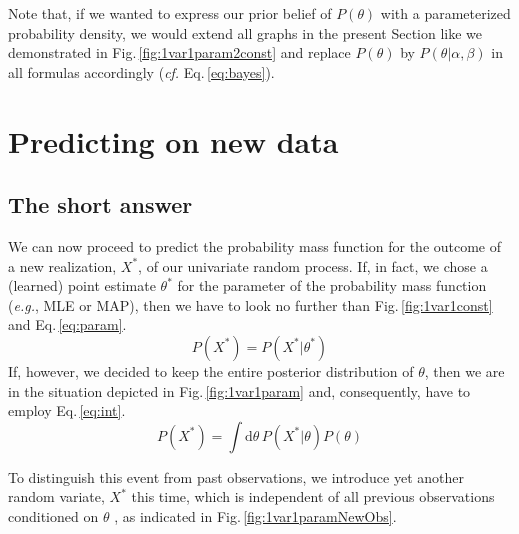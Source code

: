 \documentclass[]{report}
\begin{document}
Note that, if we wanted to express our prior belief of $P(\theta)$ with a parameterized probability density, we would extend all graphs in the present Section like we demonstrated in Fig.\,\ref{fig:1var1param2const} and replace $P(\theta)$ by $P(\theta|\alpha, \beta)$ in all formulas accordingly (\textit{cf.} Eq.\,\ref{eq:bayes}).

\section{Predicting on new data} \label{sect:predict_new}
\subsection{The short answer}
We can now proceed to predict the probability mass function for the outcome of a new realization, $X^*$, of our univariate random process. If, in fact, we chose a (learned) point estimate $\theta^*$ for the parameter of the probability mass function (\textit{e.g.}, MLE or MAP), then we have to look no further than Fig.\,\ref{fig:1var1const} and Eq.\,\ref{eq:param}.
\begin{equation}
P(X^*) = P(X^*|\theta^*)
\end{equation}
If, however, we decided to keep the entire posterior distribution of $\theta$, then we are in the situation depicted in Fig.\,\ref{fig:1var1param} and, consequently, have to employ Eq.\,\ref{eq:int}.
\begin{equation}
P(X^*) = \int\mathrm{d}\theta\,P(X^*|\theta)P(\theta)
\end{equation}

To distinguish this event from past observations, we introduce yet another random variate, $X^*$ this time, which is independent of all previous observations conditioned on $\theta$
, as indicated in Fig.\,\ref{fig:1var1paramNewObs}.
\end{document}
